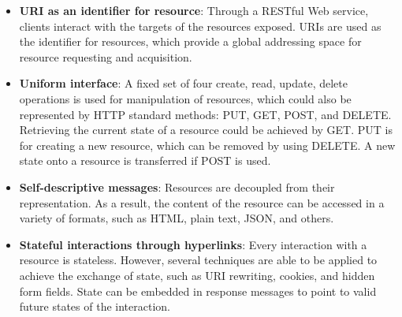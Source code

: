 \begin{itemize}
  \item \textbf{URI as an identifier for resource}:  Through a RESTful Web service, clients interact with the targets of the resources exposed. URIs are used as the identifier for resources, which provide a global addressing space for resource requesting and acquisition. 

  \item \textbf{Uniform interface}:  A fixed set of four create, read, update, delete operations is used for manipulation of resources, which could also be represented by HTTP standard methods: PUT, GET, POST, and DELETE.  Retrieving the current state of a resource could be achieved by GET. PUT is for creating a new resource, which can be removed by using DELETE. A new state onto a resource is transferred if POST is used.

  \item \textbf{Self-descriptive messages}:  Resources are decoupled from their representation. As a result, the content of the resource can be accessed in a variety of formats, such as HTML, plain text, JSON, and others.

  \item \textbf{Stateful interactions through hyperlinks}:  Every interaction with a resource is stateless. However, several techniques are able to be applied to achieve the exchange of state, such as URI rewriting, cookies, and hidden form fields. State can be embedded in response messages to point to valid future states of the interaction\cite{tutorial6oracle}. 


\end{itemize}






